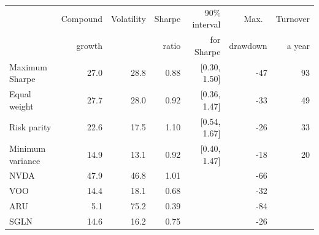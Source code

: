\begin{tabular}{lrrrrrr}
\toprule
 & Compound & Volatility & Sharpe & 90\% interval & Max.\ & Turnover \\
 & growth & & ratio & for Sharpe & drawdown & a year \\
\midrule
Maximum Sharpe & 27.0 & 28.8 & 0.88 & [0.30, 1.50] & -47 & 93 \\
Equal weight & 27.7 & 28.0 & 0.92 & [0.36, 1.47] & -33 & 49 \\
Risk parity & 22.6 & 17.5 & 1.10 & [0.54, 1.67] & -26 & 33 \\
Minimum variance & 14.9 & 13.1 & 0.92 & [0.40, 1.47] & -18 & 20 \\
\midrule
NVDA & 47.9 & 46.8 & 1.01 & & -66 & \\
VOO & 14.4 & 18.1 & 0.68 & & -32 & \\
ARU & 5.1 & 75.2 & 0.39 & & -84 & \\
SGLN & 14.6 & 16.2 & 0.75 & & -26 & \\
\bottomrule
\end{tabular}
